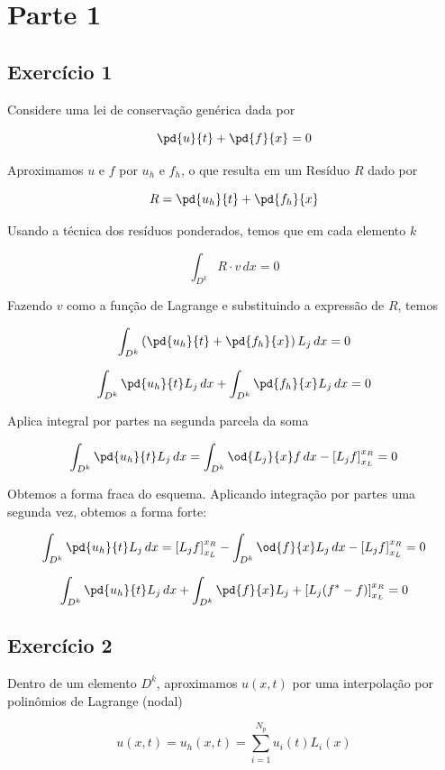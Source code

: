 \chapter{Parte 1}

\section{Exercício 1}

Considere uma lei de conservação genérica dada por

\[ \pd{u}{t} + \pd{f}{x} = 0 \]

Aproximamos $u$ e $f$ por $u_h$ e $f_h$, o que resulta em um Resíduo $R$ dado por

\[ R = \pd{u_h}{t} + \pd{f_h}{x} \]

Usando a técnica dos resíduos ponderados, temos que em cada elemento $k$

\[ \int_{D^k} R \cdot v \, dx = 0 \]

Fazendo $v$ como a função de Lagrange e substituindo a expressão de $R$, temos 

\[ \int_{D^k} \left( \pd{u_h}{t} + \pd{f_h}{x} \right)  L_j \, dx = 0 \]

\[ \int_{D^k} \pd{u_h}{t} L_j  \, dx + \int_{D^k} \pd{f_h}{x} L_j \, dx = 0 \]

Aplica integral por partes na segunda parcela da soma

\[ \int_{D^k} \pd{u_h}{t} L_j  \, dx = \int_{D^k} \od{L_j}{x} f \, dx - \left[ L_j f \right]_{x_L}^{x_R}  = 0 \]

Obtemos a forma fraca do esquema. Aplicando integração por partes uma segunda vez, obtemos
a forma forte:

\[ \int_{D^k} \pd{u_h}{t} L_j  \, dx = \left[ L_j f \right]_{x_L}^{x_R} - \int_{D^k} \od{f}{x} L_j  \, dx   - \left[ L_j f \right]_{x_L}^{x_R}  = 0 \]

\[ \int_{D^k} \pd{u_h}{t} L_j  \, dx + \int_{D^k} \pd{f}{x} L_j + \left[ L_j (f^* - f) \right]_{x_L}^{x_R} = 0 \]




\section{Exercício 2}

Dentro de um elemento $D^k$, aproximamos $u(x,t)$ por uma interpolação 
por polinômios de Lagrange (nodal)

\[ u(x,t) = u_h(x,t) = \sum_{i=1}^{N_p} u_i(t) L_i(x) \]

